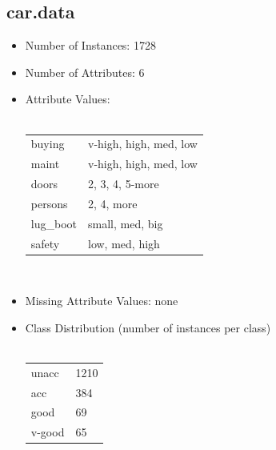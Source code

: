 \documentclass[10pt]{report}
\begin{document}
\subsection*{car.data}
\begin{itemize}
\item Number of Instances: 1728
\item Number of Attributes: 6
\item Attribute Values:
  \\\\
  \begin{left}
    \begin{tabular}{ l l }
      buying     & v-high, high, med, low \\
      maint      & v-high, high, med, low \\
      doors      & 2, 3, 4, 5-more \\
      persons    & 2, 4, more \\
      lug\_boot  & small, med, big \\
      safety     & low, med, high \\
    \end{tabular}
  \end{left}
  \\
\item Missing Attribute Values: none
\item Class Distribution (number of instances per class)
  \\\\
  \begin{left}
    \begin{tabular}{ l l }
      unacc   &  1210 \\
      acc     &   384 \\   
      good    &    69 \\     
      v-good  &    65 \\
    \end{tabular}
  \end{left}
\end{itemize}
\end{document}
